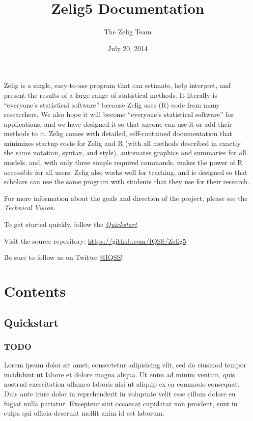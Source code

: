 \documentclass[letterpaper,10pt,english]{sphinxmanual}
\title{Zelig5 Documentation}
\date{July 20, 2014}
\author{The Zelig Team}
\begin{document}
\maketitle
\tableofcontents
{}\label{index::doc}

\label{index:about}
Zelig is a single, easy-to-use program that can estimate, help interpret, and present the results of a large range of statistical methods. It literally is ``everyone's statistical software'' because Zelig uses (R) code from many researchers. We also hope it will become ``everyone's statistical software'' for applications, and we have designed it so that anyone can use it or add their methods to it. Zelig comes with detailed, self-contained documentation that minimizes startup costs for Zelig and R (with all methods described in exactly the same notation, syntax, and style), automates graphics and summaries for all models, and, with only three simple required commands, makes the power of R accessible for all users. Zelig also works well for teaching, and is designed so that scholars can use the same program with students that they use for their research.

For more information about the goals and direction of the project, please
see the {\hyperref[index:technicalvision]{\emph{Technical Vision}}}.

To get started quickly, follow the {\hyperref[docs/quickstart:quickstart]{\emph{Quickstart}}}.

Visit the source repository: \href{https://github.com/IQSS/Zelig5}{https://github.com/IQSS/Zelig5}

Be sure to follow us on Twitter \href{https://twitter.com/IQSS}{@IQSS}!


\chapter{Contents}
\label{index:welcome-to-zelig}\label{index:contents}

\section{Quickstart}
\label{docs/quickstart::doc}\label{docs/quickstart:quickstart}\label{docs/quickstart:id1}

\subsection{TODO}
\label{docs/quickstart:todo}
Lorem ipsum dolor sit amet, consectetur adipisicing elit, sed do eiusmod tempor incididunt ut labore et dolore magna aliqua. Ut enim ad minim veniam, quis nostrud exercitation ullamco laboris nisi ut aliquip ex ea commodo consequat. Duis aute irure dolor in reprehenderit in voluptate velit esse cillum dolore eu fugiat nulla pariatur. Excepteur sint occaecat cupidatat non proident, sunt in culpa qui officia deserunt mollit anim id est laborum.
\end{document}
